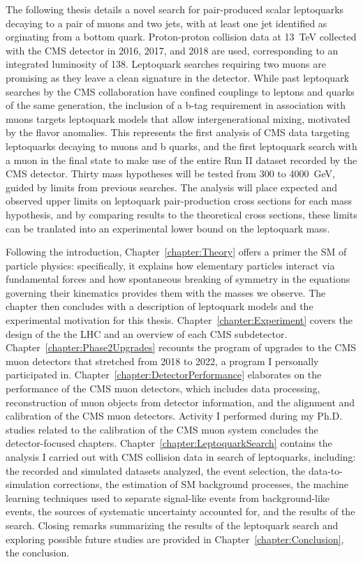 The following thesis details a novel search for pair-produced scalar leptoquarks decaying to a pair of muons and two jets, with at least one jet identified as orginating from a bottom quark. Proton-proton collision data at \SI{13}{\TeV} collected with the CMS detector in 2016, 2017, and 2018 are used, corresponding to an integrated luminosity of \SI{138}{\invfb}. Leptoquark searches requiring two muons are promising as they leave a clean signature in the detector. While past leptoquark searches by the CMS collaboration have confined couplings to leptons and quarks of the same generation, the inclusion of a b-tag requirement in association with muons targets leptoquark models that allow intergenerational mixing, motivated by the flavor anomalies. This represents the first analysis of CMS data targeting leptoquarks decaying to muons and b quarks, and the first leptoquark search with a muon in the final state to make use of the entire Run II dataset recorded by the CMS detector. Thirty mass hypotheses will be tested from 300 to \SI{4000}{\GeV}, guided by limits from previous searches. The analysis will place expected and observed upper limits on leptoquark pair-production cross sections for each mass hypothesis, and by comparing results to the theoretical cross sections, these limits can be tranlated into an experimental lower bound on the leptoquark mass.

Following the introduction, Chapter~\ref{chapter:Theory} offers a primer the SM of particle physics: specifically, it explains how elementary particles interact via fundamental forces and how spontaneous breaking of symmetry in the equations governing their kinematics provides them with the masses we observe. The chapter then concludes with a description of leptoquark models and the experimental motivation for this thesis. Chapter~\ref{chapter:Experiment} covers the design of the the LHC and an overview of each CMS subdetector. Chapter~\ref{chapter:Phase2Upgrades} recounts the program of upgrades to the CMS muon detectors that stretched from 2018 to 2022, a program I personally participated in. Chapter~\ref{chapter:DetectorPerformance} elaborates on the performance of the CMS muon detectors, which includes data processing, reconstruction of muon objects from detector information, and the alignment and calibration of the CMS muon detectors. Activity I performed during my Ph.D. studies related to the calibration of the CMS muon system concludes the detector-focused chapters. Chapter~\ref{chapter:LeptoquarkSearch} contains the analysis I carried out with CMS collision data in search of leptoquarks, including: the recorded and simulated datasets analyzed, the event selection, the data-to-simulation corrections, the estimation of SM background processes, the machine learning techniques used to separate signal-like events from background-like events, the sources of systematic uncertainty accounted for, and the results of the search. Closing remarks summarizing the results of the leptoquark search and exploring possible future studies are provided in Chapter~\ref{chapter:Conclusion}, the conclusion.  